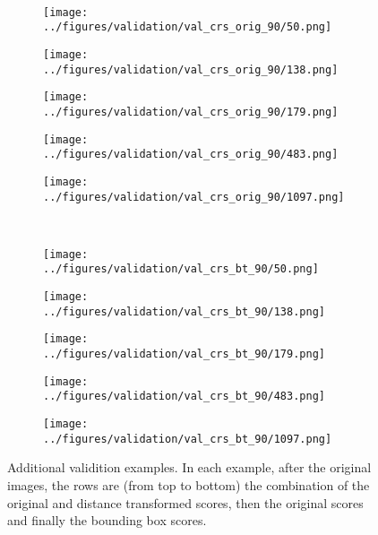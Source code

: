 \begin{figure}[h!]
		\vspace{-0.35cm}
	\\
	\begin{subfigure}{0.19\textwidth}
		\centering
		\texttt{[image: ../figures/validation/val\_crs\_orig\_90/50.png]}
		\label{fig:1}
	\end{subfigure}
	\begin{subfigure}{0.19\textwidth}
		\centering
		\texttt{[image: ../figures/validation/val\_crs\_orig\_90/138.png]}
		\label{fig:1}
	\end{subfigure}
	\begin{subfigure}{0.19\textwidth}
		\centering
		\texttt{[image: ../figures/validation/val\_crs\_orig\_90/179.png]}
		\label{fig:1}
	\end{subfigure}
	\begin{subfigure}{0.19\textwidth}
		\centering
		\texttt{[image: ../figures/validation/val\_crs\_orig\_90/483.png]}
		\label{fig:1}
	\end{subfigure}
	\begin{subfigure}{0.19\textwidth}
		\centering
		\texttt{[image: ../figures/validation/val\_crs\_orig\_90/1097.png]}
		\label{fig:1}
	\end{subfigure}
			\vspace{-0.35cm}
	\\
	\begin{subfigure}{0.19\textwidth}
		\centering
		\texttt{[image: ../figures/validation/val\_crs\_bt\_90/50.png]}
		\label{fig:1}
	\end{subfigure}
	\begin{subfigure}{0.19\textwidth}
		\centering
		\texttt{[image: ../figures/validation/val\_crs\_bt\_90/138.png]}
		\label{fig:1}
	\end{subfigure}
	\begin{subfigure}{0.19\textwidth}
		\centering
		\texttt{[image: ../figures/validation/val\_crs\_bt\_90/179.png]}
		\label{fig:1}
	\end{subfigure}
	\begin{subfigure}{0.19\textwidth}
		\centering
		\texttt{[image: ../figures/validation/val\_crs\_bt\_90/483.png]}
		\label{fig:1}
	\end{subfigure}
	\begin{subfigure}{0.19\textwidth}
		\centering
		\texttt{[image: ../figures/validation/val\_crs\_bt\_90/1097.png]}
		\label{fig:1}
	\end{subfigure}
	\label{fig:grid}
	\caption{Additional validition examples. In each example, after the original images, the rows are (from top to bottom) the combination of the original and distance transformed scores, then the original scores and finally the bounding box scores.}\label{fig:polpysex2}
\end{figure}

